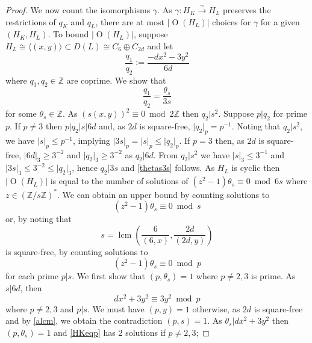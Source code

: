 \documentclass[12pt, a4paper]{article}
\newcommand{\ZZ}{\mathbb{Z}}
\newcommand{\la}{\langle}
\newcommand{\ra}{\rangle}
\newcommand{\opn}{\operatorname}
\newcommand{\op}{\oplus}
\begin{document}
\begin{proof}
    We now count the isomorphisms $\gamma$.
    As $\gamma:H_K \xrightarrow{\sim} H_L$ preserves the restrictions of $q_K$ and $q_L$, there are at most $\vert \opn{O}(H_L) \vert$ choices for $\gamma$ for a given $(H_K, H_L)$.
    To bound $\vert \opn{O}(H_L) \vert$, suppose $H_L \cong \la (x,y) \ra \subset D(L) \cong C_6 \op C_{2d}$ and let 
\[
    \frac{q_1}{q_2} := \frac{-dx^2 - 3y^2}{6d}
    \]
where $q_1, q_2 \in \ZZ$ are coprime.
    We show that
    \begin{equation}\label{thetas3s}
      \frac{q_1}{q_2} = \frac{\theta_s}{3s}
    \end{equation}
    for some $\theta_s \in \ZZ$.
    As $(s(x,y))^2 \equiv 0 \bmod{ 2 \ZZ}$ then $q_2 \vert s^2$.
    Suppose $p \vert q_2$ for prime $p$. 
    If $p \neq 3$ then $p \vert q_2 \vert s \vert 6d$ and, as $2d$ is square-free, $\vert q_2 \vert_p = p^{-1}$.
    Noting that $q_2 \vert s^2$, we have $\vert s \vert_p \leq p^{-1}$, implying $\vert 3s \vert_p = \vert s \vert_p \leq \vert q_2 \vert_p$. If $p=3$ then, as $2d$ is square-free, $\vert 6d \vert_3 \geq 3^{-2}$  and $\vert q_2 \vert_3 \geq 3^{-2}$ as $q_2 \vert 6d$.
    From $q_2 \vert s^2$ we have $\vert s \vert_3 \leq 3^{-1}$ and $\vert 3 s \vert_3 \leq 3^{-2} \leq \vert q_2 \vert_3$, 
    hence $q_2 \vert 3s$ and \eqref{thetas3s} follows.
    As $H_L$ is cyclic then  $\vert \opn{O}(H_L) \vert$ is equal to the number of  solutions of
    $(z^2 - 1) \theta_s \equiv 0 \bmod{ 6s}$
    where
    $z \in (\ZZ/s\ZZ)^*$.
    We can obtain an upper bound  by counting solutions to 
\[
    (z^2 - 1) \theta_s \equiv 0 \bmod{ s}
    \]
or, by noting that   
    \begin{equation}\label{alcm}
      s = \opn{lcm} \left( \frac{6}{(6,x)}, \frac{2d}{(2d,y)} \right )
    \end{equation}
    is square-free, by counting solutions to
    \begin{equation}\label{HKeqp}
      (z^2 -1) \theta_s \equiv 0 \bmod{ p}
    \end{equation}
    for each prime $p \vert s$.
    We first show that $(p, \theta_s) = 1$ where $p \neq 2, 3$ is prime. 
    As $s \vert 6d$, then 
    \begin{equation*}
      dx^2 + 3y^2 \equiv 3y^2 \bmod{ p}
    \end{equation*}
    where $p \neq 2,3$ and $p \vert s$.
    We must have $(p,y)=1$ otherwise, as $2d$ is square-free and by \eqref{alcm}, we obtain the contradiction $(p,s)=1$.
    As $\theta_s \vert dx^2 + 3y^2$ then $(p,  \theta_s)=1$ and 
\eqref{HKeqp}   has 2 solutions if $p \neq 2,3$;

\end{proof}
\end{document}
